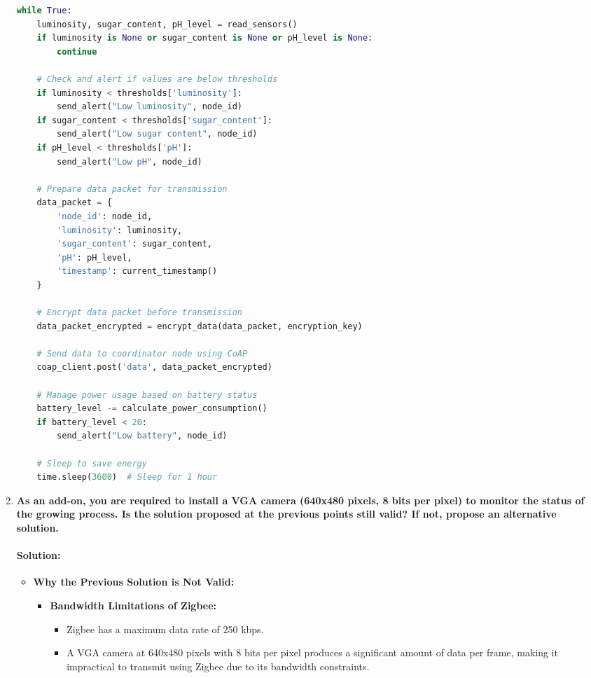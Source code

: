 \documentclass{article}
\begin{document}
\begin{enumerate}
\begin{lstlisting}[language=Python]
while True:
    luminosity, sugar_content, pH_level = read_sensors()
    if luminosity is None or sugar_content is None or pH_level is None:
        continue

    # Check and alert if values are below thresholds
    if luminosity < thresholds['luminosity']:
        send_alert("Low luminosity", node_id)
    if sugar_content < thresholds['sugar_content']:
        send_alert("Low sugar content", node_id)
    if pH_level < thresholds['pH']:
        send_alert("Low pH", node_id)

    # Prepare data packet for transmission
    data_packet = {
        'node_id': node_id,
        'luminosity': luminosity,
        'sugar_content': sugar_content,
        'pH': pH_level,
        'timestamp': current_timestamp()
    }

    # Encrypt data packet before transmission
    data_packet_encrypted = encrypt_data(data_packet, encryption_key)

    # Send data to coordinator node using CoAP
    coap_client.post('data', data_packet_encrypted)

    # Manage power usage based on battery status
    battery_level -= calculate_power_consumption()
    if battery_level < 20:
        send_alert("Low battery", node_id)

    # Sleep to save energy
    time.sleep(3600)  # Sleep for 1 hour
\end{lstlisting}



\item \textbf{As an add-on, you are required to install a VGA camera (640x480 pixels, 8 bits per pixel) to monitor the status of the growing process. Is the solution proposed at the previous points still valid? If not, propose an alternative solution.}

\paragraph{Solution:}

\begin{itemize}
    \item \textbf{Why the Previous Solution is Not Valid:}
    \begin{itemize}
        \item \textbf{Bandwidth Limitations of Zigbee:}
        \begin{itemize}
            \item Zigbee has a maximum data rate of 250 kbps.
            \item A VGA camera at 640x480 pixels with 8 bits per pixel produces a significant amount of data per frame, making it impractical to transmit using Zigbee due to its bandwidth constraints.
        \end{itemize}
        

\end{itemize}
\end{itemize}
\end{enumerate}
\end{document}
